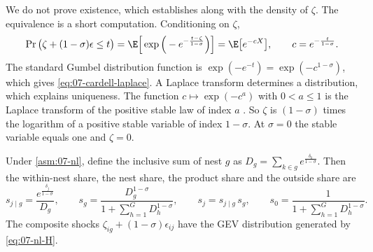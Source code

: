 We do not prove existence, which \citet{Cardell1997} establishes along with the density of $\zeta$. The
equivalence is a short computation. Conditioning on $\zeta$,
\begin{equation*}
\Pr\big(\zeta + (1-\sigma)\epsilon \le t\big) = \E\Big[\exp\Big(-e^{-\frac{t - \zeta}{1-\sigma}}\Big)\Big]
= \E\big[e^{-cX}\big], \qquad c = e^{-\frac{t}{1-\sigma}} .
\end{equation*}
The standard Gumbel distribution function is $\exp(-e^{-t}) = \exp(-c^{1-\sigma})$, which gives
\eqref{eq:07-cardell-laplace}. A Laplace transform determines a distribution, which explains uniqueness. The
function $c \mapsto \exp(-c^{a})$ with $0 < a \le 1$ is the Laplace transform of the positive stable law of index
$a$ \citep{Feller1971}. So $\zeta$ is $(1-\sigma)$ times the logarithm of a positive stable variable of index
$1 - \sigma$. At $\sigma = 0$ the stable variable equals one and $\zeta = 0$.

\begin{proposition}\label{prop:07-nl-shares}
Under \cref{asm:07-nl}, define the inclusive sum of nest $g$ as
$D_g = \sum_{k \in g} e^{\frac{\delta_k}{1-\sigma}}$. Then the within-nest share, the nest share, the product share
and the outside share are
\begin{equation}\label{eq:07-nl-share}
s_{j \mid g} = \frac{e^{\frac{\delta_j}{1-\sigma}}}{D_g}, \qquad
s_g = \frac{D_g^{1-\sigma}}{1 + \sum_{h=1}^G D_h^{1-\sigma}}, \qquad
s_j = s_{j \mid g}\,s_g, \qquad
s_0 = \frac{1}{1 + \sum_{h=1}^G D_h^{1-\sigma}} .
\end{equation}
The composite shocks $\zeta_{ig} + (1-\sigma)\epsilon_{ij}$ have the GEV distribution generated by
\eqref{eq:07-nl-H}.
\end{proposition}

